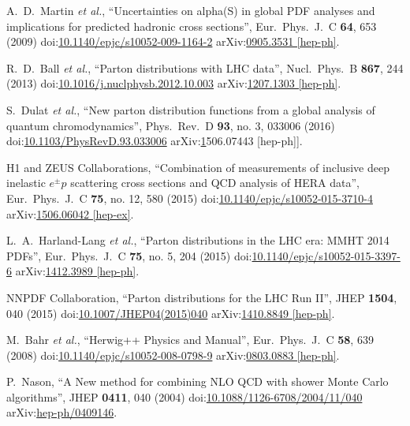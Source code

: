 \begin{thebibliography}{99}
  A.~D.~Martin {\it et al.}, ``Uncertainties on alpha(S) in global PDF analyses and implications for predicted hadronic cross sections'', Eur.\ Phys.\ J.\ C {\bf 64}, 653 (2009) doi:\href{http://dx.doi.org/10.1140/epjc/s10052-009-1164-2}{10.1140/epjc/s10052-009-1164-2} arXiv:\href{https://arxiv.org/abs/0905.3531}{0905.3531 [hep-ph]}.

R.~D.~Ball {\it et al.}, ``Parton distributions with LHC data'', Nucl.\ Phys.\ B {\bf 867}, 244 (2013) doi:\href{http://dx.doi.org/10.1016/j.nuclphysb.2012.10.003}{10.1016/j.nuclphysb.2012.10.003} arXiv:\href{https://arxiv.org/abs/1207.1303}{1207.1303 [hep-ph]}.

S.~Dulat {\it et al.}, ``New parton distribution functions from a global analysis of quantum chromodynamics'', Phys.\ Rev.\ D {\bf 93}, no. 3, 033006 (2016) doi:\href{http://dx.doi.org/10.1103/PhysRevD.93.033006}{10.1103/PhysRevD.93.033006} arXiv:\href{https://arxiv.org/abs/1506.07443}1506.07443 [hep-ph]].

H1 and ZEUS Collaborations, ``Combination of measurements of inclusive deep inelastic ${e^{\pm }p}$ scattering cross sections and QCD analysis of HERA data'', Eur.\ Phys.\ J.\ C {\bf 75}, no. 12, 580 (2015) doi:\href{http://dx.doi.org/10.1140/epjc/s10052-015-3710-4}{10.1140/epjc/s10052-015-3710-4} arXiv:\href{https://arxiv.org/abs/1506.06042}{1506.06042 [hep-ex]}.

L.~A.~Harland-Lang {\it et al.}, ``Parton distributions in the LHC era: MMHT 2014 PDFs'', Eur.\ Phys.\ J.\ C {\bf 75}, no. 5, 204 (2015) doi:\href{http://dx.doi.org/10.1140/epjc/s10052-015-3397-6}{10.1140/epjc/s10052-015-3397-6} arXiv:\href{https://arxiv.org/abs/1412.3989}{1412.3989 [hep-ph]}.

NNPDF Collaboration, ``Parton distributions for the LHC Run II'', JHEP {\bf 1504}, 040 (2015) doi:\href{http://dx.doi.org/10.1007/JHEP04(2015)040}{10.1007/JHEP04(2015)040} arXiv:\href{https://arxiv.org/abs/1410.8849}{1410.8849 [hep-ph]}.
  
M.~Bahr {\it et al.}, ``Herwig++ Physics and Manual'', Eur.\ Phys.\ J.\ C {\bf 58}, 639 (2008) doi:\href{http://dx.doi.org/10.1140/epjc/s10052-008-0798-9}{10.1140/epjc/s10052-008-0798-9} arXiv:\href{https://arxiv.org/abs/0803.0883}{0803.0883 [hep-ph]}.  

P.~Nason, ``A New method for combining NLO QCD with shower Monte Carlo algorithms'', JHEP {\bf 0411}, 040 (2004) doi:\href{http://dx.doi.org/10.1088/1126-6708/2004/11/040}{10.1088/1126-6708/2004/11/040} arXiv:\href{https://arxiv.org/abs/hep-ph/0409146}{hep-ph/0409146}.
  

\end{thebibliography}
